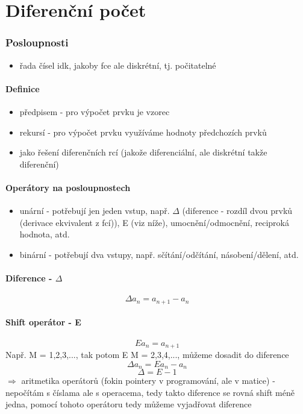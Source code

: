 \documentclass{article}
\begin{document}
\part{Diferenční počet}

\section{Posloupnosti}
\begin{itemize}
  \item řada čísel idk, jakoby fce ale diskrétní, tj. počitatelné
\end{itemize}

\subsection{Definice}
\begin{itemize}
  \item předpisem - pro výpočet prvku je vzorec
  \item rekursí - pro výpočet prvku využíváme hodnoty předchozích prvků
  \item jako řešení diferenčních rcí (jakože diferenciální, ale diskrétní takže diferenční)
\end{itemize}

\subsection{Operátory na posloupnostech}
\begin{itemize}
  \item unární - potřebují jen jeden vstup, např. $\Delta$ (diference - rozdíl dvou prvků (derivace ekvivalent z fcí)), E (viz níže), umocnění/odmocnění, reciproká hodnota, atd.
  \item binární - potřebují dva vstupy, např. sčítání/odčítání, násobení/dělení, atd.
\end{itemize}

\subsection{Diference - $\Delta$}
$$\Delta a_n = a_{n+1} - a_n$$

\subsection{Shift operátor - E}
  $$E a_n = a_{n+1}$$
  Např. M = {1,2,3,...}, tak potom E M = {2,3,4,...}, můžeme dosadit do diference
  $$\Delta a_n = E a_n - a_n$$
  $$\Delta = E - 1$$ $\Rightarrow$ aritmetika operátorů (fokin pointery v programování, ale v matice) - nepočítám s číslama ale s operacema, tedy takto diference se rovná shift méně jedna, pomocí tohoto operátoru tedy můžeme vyjadřovat diference
\end{document}
